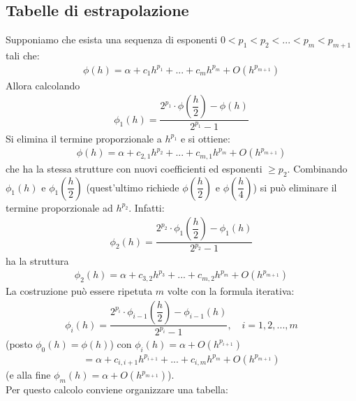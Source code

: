 \documentclass[12pt,a4paper]{article}
\begin{document}
\subsection{Tabelle di estrapolazione}
Supponiamo che esista una sequenza di esponenti $ 0<p_1<p_2<...<p_m<p_{m+1}$ tali che:
\[ \begin{split}
	\phi(h)=\alpha+c_1h^{p_1}+...+c_mh^{p_m}+O(h^{p_{m+1}})
\end{split} \]
Allora calcolando
\[ \begin{split}
	\phi_1(h)=\dfrac{2^{p_1}\cdot \phi\left( \dfrac{h}{2} \right)-\phi (h) }{2^{p_1}-1}
\end{split} \]
Si elimina il termine proporzionale a $h^{p_1}$ e si ottiene:
\[ \begin{split}
	\phi(h)=\alpha+c_{2,1}h^{p_2}+...+c_{m,1}h^{p_m}+O(h^{p_{m+1}})
\end{split} \]
che ha la stessa strutture con
nuovi coefficienti ed esponenti $\geq p_2$. Combinando $\phi_1(h)$ e $\phi_1 \left( \dfrac{h}{2} \right)$ (quest'ultimo richiede $\phi \left( \dfrac{h}{2} \right)$ e $\phi \left( \dfrac{h}{4} \right)$) si può eliminare il termine proporzionale ad $h^{p_2}$. Infatti:
\[ \begin{split}
	\phi_2(h)=\dfrac{2^{p_2}\cdot \phi_1\left( \dfrac{h}{2} \right) -\phi_1 (h)}{2^{p_2}-1}
\end{split} \]
ha la struttura
\[ \begin{split}
	\phi_2(h)=\alpha+c_{3,2}h^{p_3}+...+c_{m,2}h^{p_m}+O(h^{p_{m+1}})
\end{split} \]
La costruzione può essere ripetuta $m$ volte con la formula iterativa:
\[ \begin{split}
	\phi_i(h)=\dfrac{2^{p_i}\cdot \phi_{i-1} \left( \dfrac{h}{2} \right) -\phi_{i-1} (h)}{2^{p_i}-1}, \quad i=1,2,...,m
\end{split} \]
(posto $\phi_0(h)=\phi(h)$) con  $\phi_i(h)=\alpha + O(h^{p_{i+1}})$
\[ \begin{split}
	=\alpha+c_{i,i+1}h^{p_{i+1}}+...+c_{i,m}h^{p_m}+O(h^{p_{m+1}})
\end{split} \]
(e alla fine $\phi_m(h)=\alpha + O(h^{p_{m+1}})$).\\
Per questo calcolo conviene organizzare una tabella:
\end{document}
